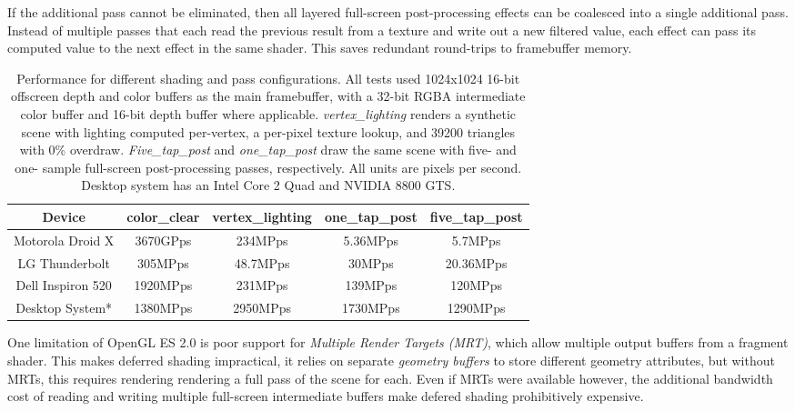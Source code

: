 If the additional pass cannot be eliminated, then all layered full-screen
post-processing effects can be coalesced into a single additional pass.
Instead of multiple passes that each read the previous result from a texture
and write out a new filtered value, each effect can pass its computed value to
the next effect in the same shader.  This saves redundant round-trips to
framebuffer memory.

\begin{table}[htb]\centering \begin{tabular}{|c||c|c|c|c|} 
\hline \small{Device} & \small{color\_clear} & \small{vertex\_lighting} & \small{one\_tap\_post} & \small{five\_tap\_post}  \\ \hline 
\hline \small{Motorola Droid X} & \small{3670GPps} & \small{234MPps}& \small{5.36MPps\footnotemark[1]} & \small{5.7MPps\footnotemark[1]} \\ 
\hline \small{LG Thunderbolt} & \small{305MPps} & \small{48.7MPps}& \small{30MPps} & \small{20.36MPps} \\ 
\hline \small{Dell Inspiron 520} & \small{1920MPps} & \small{231MPps}& \small{139MPps} & \small{120MPps} \\ 
\hline \small{Desktop System*} & \small{1380MPps} & \small{2950MPps}& \small{1730MPps} & \small{1290MPps} \\ 
\hline
\end{tabular} 
\caption{Performance for different shading and pass configurations.  All tests used 1024x1024 16-bit offscreen depth and color buffers as the main framebuffer, with a 32-bit RGBA intermediate color buffer and 16-bit depth buffer where applicable.  \textit{vertex\_lighting} renders a synthetic scene with lighting computed per-vertex, a per-pixel texture lookup, and 39200 triangles with 0\% overdraw.  \textit{Five\_tap\_post} and \textit{one\_tap\_post} draw the same scene with five- and one- sample full-screen post-processing passes, respectively.  All units are pixels per second.  Desktop system has an Intel Core 2 Quad and NVIDIA 8800 GTS.}
\label{JonMcCaffrey:pass_performance} \end{table}


One limitation of OpenGL ES 2.0 is poor support for \textit{Multiple Render
Targets (MRT)}, which allow multiple output buffers from a fragment shader.
This makes deferred shading impractical, it relies on separate \textit{geometry
buffers} to store different geometry attributes, but without MRTs, this
requires rendering rendering a full pass of the scene for each.  Even if MRTs
were available however, the additional bandwidth cost of reading and writing
multiple full-screen intermediate buffers make defered shading prohibitively expensive.

